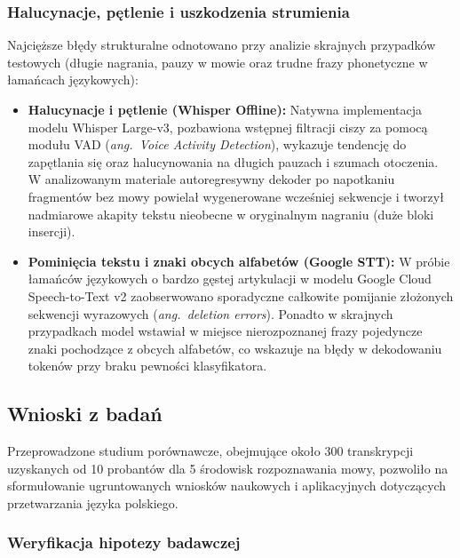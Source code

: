 \subsubsection{Halucynacje, pętlenie i uszkodzenia strumienia}
\label{subsubsec:hallucinations_deletions}

Najcięższe błędy strukturalne odnotowano przy analizie skrajnych przypadków testowych (długie nagrania, pauzy w mowie oraz trudne frazy phonetyczne w łamańcach językowych):

\begin{itemize}
    \item \textbf{Halucynacje i pętlenie (Whisper Offline):} Natywna implementacja modelu Whisper Large-v3, pozbawiona wstępnej filtracji ciszy za pomocą modułu VAD (\textit{ang.~Voice Activity Detection}), wykazuje tendencję do zapętlania się oraz halucynowania na długich pauzach i szumach otoczenia. W analizowanym materiale autoregresywny dekoder po napotkaniu fragmentów bez mowy powielał wygenerowane wcześniej sekwencje i tworzył nadmiarowe akapity tekstu nieobecne w oryginalnym nagraniu (duże bloki insercji).
    \item \textbf{Pominięcia tekstu i znaki obcych alfabetów (Google STT):} W próbie łamańców językowych o bardzo gęstej artykulacji w modelu Google Cloud Speech-to-Text v2 zaobserwowano sporadyczne całkowite pomijanie złożonych sekwencji wyrazowych (\textit{ang.~deletion errors}). Ponadto w skrajnych przypadkach model wstawiał w miejsce nierozpoznanej frazy pojedyncze znaki pochodzące z obcych alfabetów, co wskazuje na błędy w dekodowaniu tokenów przy braku pewności klasyfikatora.
\end{itemize}

\subsection{Wnioski z badań}
\label{subsec:conclusions}

Przeprowadzone studium porównawcze, obejmujące około $300$ transkrypcji uzyskanych od 10 probantów dla 5 środowisk rozpoznawania mowy, pozwoliło na sformułowanie ugruntowanych wniosków naukowych i aplikacyjnych dotyczących przetwarzania języka polskiego.

\subsubsection{Weryfikacja hipotezy badawczej}
\label{subsubsec:hypothesis_verification}

